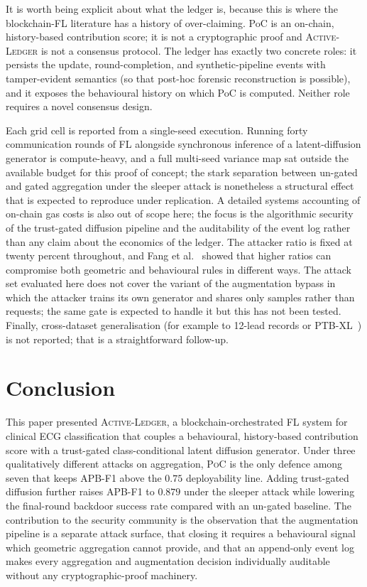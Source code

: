 \documentclass[runningheads]{llncs}
\newcommand{\poc}{\textsc{PoC}\xspace}
\newcommand{\actledger}{\textsc{Active-Ledger}\xspace}
\begin{document}
It is worth being explicit about what the ledger is, because this
is where the blockchain-FL literature has a history of over-claiming.
PoC is an on-chain, history-based contribution score; it is not a
cryptographic proof and \actledger is not a consensus protocol. The
ledger has exactly two concrete roles: it persists the update,
round-completion, and synthetic-pipeline events with tamper-evident
semantics (so that post-hoc forensic reconstruction is possible),
and it exposes the behavioural history on which PoC is computed.
Neither role requires a novel consensus design.

Each grid cell is reported from a single-seed execution. Running
forty communication rounds of FL alongside synchronous inference of
a latent-diffusion generator is compute-heavy, and a full multi-seed
variance map sat outside the available budget for this proof of
concept; the stark separation between un-gated and gated aggregation
under the sleeper attack is nonetheless a structural effect that is
expected to reproduce under replication. A detailed systems
accounting of on-chain gas costs is also out of scope here; the
focus is the algorithmic security of the trust-gated diffusion
pipeline and the auditability of the event log rather than any claim
about the economics of the ledger. The attacker ratio is fixed at
twenty percent throughout, and Fang et al.~\cite{fang2020local}
showed that higher ratios can compromise both geometric and
behavioural rules in different ways. The attack set evaluated here
does not cover the variant of the augmentation bypass in which the
attacker trains its own generator and shares only samples rather
than requests; the same gate is expected to handle it but this has
not been tested. Finally, cross-dataset generalisation (for example
to 12-lead records or PTB-XL~\cite{jimenez2024ecg}) is not reported;
that is a straightforward follow-up.

\section{Conclusion}
\label{sec:conclusion}

This paper presented \actledger, a blockchain-orchestrated FL
system for clinical ECG classification that couples a behavioural,
history-based contribution score with a trust-gated
class-conditional latent diffusion generator. Under three
qualitatively different attacks on aggregation, \poc is the only
defence among seven that keeps APB-F1 above the $0.75$ deployability
line. Adding trust-gated diffusion further raises APB-F1 to
$0.879$ under the sleeper attack while lowering the final-round
backdoor success rate compared with an un-gated baseline. The
contribution to the security community is the observation that the augmentation pipeline is
a separate attack surface, that closing it requires a behavioural
signal which geometric aggregation cannot provide, and that an
append-only event log makes every aggregation and augmentation
decision individually auditable without any cryptographic-proof
machinery.
\end{document}
